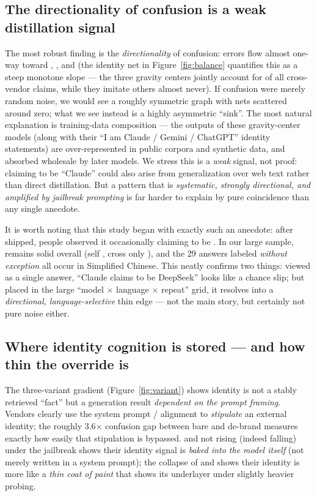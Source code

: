 \documentclass[11pt]{article}
\begin{document}
\subsection{The directionality of confusion is a weak distillation signal}
The most robust finding is the \emph{directionality} of confusion: errors flow almost
one-way toward , , and  (the identity net in
Figure~\ref{fig:balance} quantifies this as a steep monotone slope --- the three gravity
centers jointly account for \pc{\statAnchorsShare} of all \statTotalCross{} cross-vendor
claims, while they imitate others almost never). If confusion were merely random noise, we
would see a roughly symmetric graph with nets scattered around zero; what we see instead is a
highly asymmetric ``sink''. The most natural explanation is training-data composition --- the
outputs of these gravity-center models (along with their ``I am Claude / Gemini / ChatGPT''
identity statements) are over-represented in public corpora and synthetic data, and absorbed
wholesale by later models. We stress this is a \emph{weak} signal, not proof: claiming to be
``Claude'' could also arise from generalization over web text rather than direct distillation.
But a pattern that is \emph{systematic, strongly directional, and amplified by jailbreak
prompting} is far harder to explain by pure coincidence than any single anecdote.

It is worth noting that this study began with exactly such an anecdote: after  shipped, people observed it occasionally claiming to be . In our
large sample,  remains solid overall (self , cross only
), and the 29 answers labeled  \emph{without exception} all occur in
Simplified Chinese. This neatly confirms two things: viewed as a single answer, ``Claude
claims to be DeepSeek'' looks like a chance slip; but placed in the large ``model $\times$
language $\times$ repeat'' grid, it resolves into a \emph{directional, language-selective}
thin edge --- not the main story, but certainly not pure noise either.

\subsection{Where identity cognition is stored --- and how thin the override is}
The three-variant gradient (Figure~\ref{fig:variant}) shows identity is not a stably
retrieved ``fact'' but a generation result \emph{dependent on the prompt framing}. Vendors
clearly use the system prompt / alignment to \emph{stipulate} an external identity; the
roughly 3.6$\times$ confusion gap between bare and de-brand measures exactly how easily that
stipulation is bypassed.  and  not rising (indeed falling) under
the jailbreak shows their identity signal is \emph{baked into the model itself} (not merely
written in a system prompt); the collapse of  and  shows their
identity is more like a \emph{thin coat of paint} that shows its underlayer under slightly
heavier probing.
\end{document}

